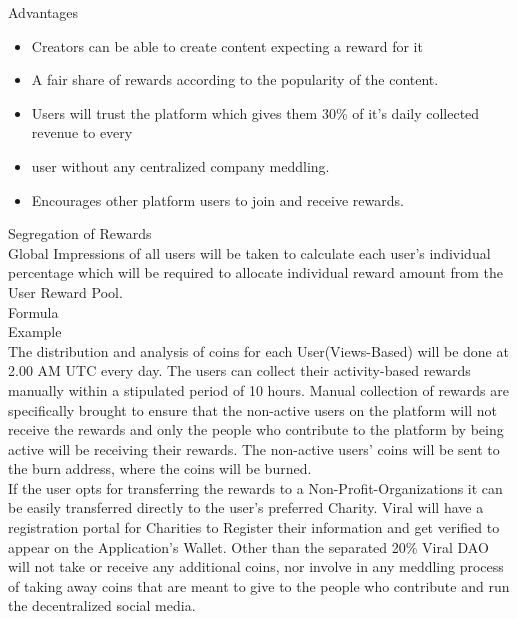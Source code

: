 \documentclass[10pt]{article}
\begin{document}
Advantages\\

\begin{itemize}[leftmargin=+0.2in]
\item Creators can be able to create content expecting a reward for it
\item A fair share of rewards according to the popularity of the content.
\item Users will trust the platform which gives them 30\% of it’s daily collected revenue to every \item user without any centralized company meddling.
\item Encourages other platform users to join and receive rewards.
\end{itemize}


Segregation of Rewards\\

Global Impressions of all users will be taken to calculate each user’s individual percentage which will be required to allocate individual reward amount from the User Reward Pool.\\

Formula\\

Example\\

The distribution and analysis of coins for each User(Views-Based) will be done at 2.00 AM UTC every day. The users can collect their activity-based rewards manually within a stipulated period of 10 hours. Manual collection of rewards are specifically brought to ensure that the non-active users on the platform will not receive the rewards and only the people who contribute to the platform by being active will be receiving their rewards. The non-active users' coins will be sent to the burn address, where the coins will be burned.\\

If the user opts for transferring the rewards to a Non-Profit-Organizations it can be easily transferred directly to the user's preferred Charity. Viral will have a registration portal for Charities to Register their information and get verified to appear on the Application's Wallet. Other than the separated 20\% Viral DAO will not take or receive any additional coins, nor involve in any meddling process of taking away coins that are meant to give to the people who contribute and run the decentralized social media.\\
\end{document}
